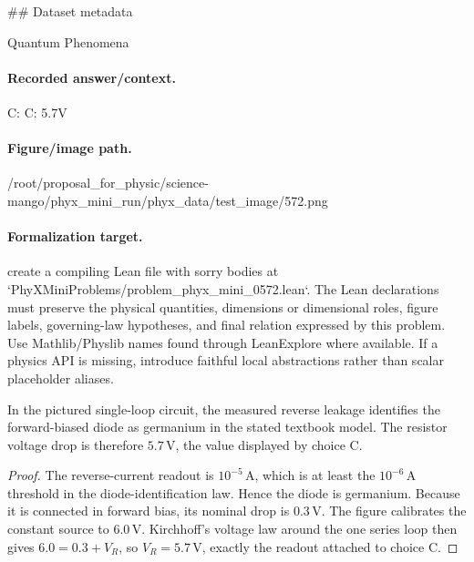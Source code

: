 \#\# Dataset metadata

Quantum Phenomena

\paragraph{Recorded answer/context.}
C: C: 5.7V

\paragraph{Figure/image path.}
/root/proposal\_for\_physic/science-mango/phyx\_mini\_run/phyx\_data/test\_image/572.png

\paragraph{Formalization target.}
create a compiling Lean file with sorry bodies at `PhyXMiniProblems/problem\_phyx\_mini\_0572.lean`. The Lean declarations must preserve the physical quantities, dimensions or dimensional roles, figure labels, governing-law hypotheses, and final relation expressed by this problem.
Use Mathlib/Physlib names found through LeanExplore where available. If a physics API is missing, introduce faithful local abstractions rather than scalar placeholder aliases.

\begin{theorem}
\label{thm:physics:phyx_mini_0572:target}
In the pictured single-loop circuit, the measured reverse leakage identifies
the forward-biased diode as germanium in the stated textbook model.  The
resistor voltage drop is therefore $5.7\,\mathrm{V}$, the value displayed by
choice C.
\end{theorem}
\begin{proof}
The reverse-current readout is $10^{-5}\,\mathrm{A}$, which is at least the
$10^{-6}\,\mathrm{A}$ threshold in the diode-identification law.  Hence the
diode is germanium.  Because it is connected in forward bias, its nominal
drop is $0.3\,\mathrm{V}$.  The figure calibrates the constant source to
$6.0\,\mathrm{V}$.  Kirchhoff's voltage law around the one series loop then
gives $6.0=0.3+V_R$, so $V_R=5.7\,\mathrm{V}$, exactly the readout attached
to choice C.
\end{proof}

